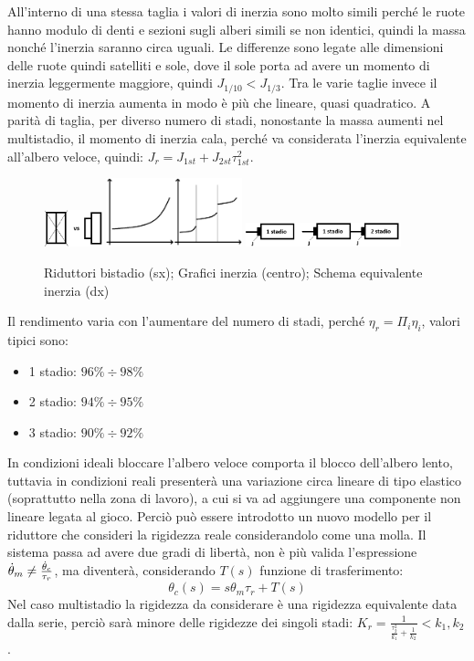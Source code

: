 All'interno di una stessa taglia i valori di inerzia sono molto simili perché le ruote hanno modulo di denti e sezioni sugli alberi simili se non identici, quindi la massa nonché l'inerzia saranno circa uguali.
Le differenze sono legate alle dimensioni delle ruote quindi satelliti e sole, dove il sole porta ad avere un momento di inerzia leggermente maggiore, quindi $J_{1/10}<J_{1/3}$.
Tra le varie taglie invece il momento di inerzia aumenta in modo è più che lineare, quasi quadratico.
A parità di taglia, per diverso numero di stadi, nonostante la massa aumenti nel multistadio, il momento di inerzia cala, perché va considerata l'inerzia equivalente all'albero veloce, quindi: $J_r=J_{1st}+J_{2st}\tau_{1st}^2$.

\begin{figure}[h]
    \centering
    \includegraphics[width=0.15\textwidth]{Immagini/ridutt_2st_diff_dim.png}
    \includegraphics[width=0.35\textwidth]{Immagini/momento_inerzia_stadi.png}
    \includegraphics[width=0.4\textwidth]{Immagini/momento_inerzia_albero_veloce.png}
    \caption{Riduttori bistadio (sx); Grafici inerzia (centro); Schema equivalente inerzia (dx)}
\end{figure}

Il rendimento varia con l'aumentare del numero di stadi, perché $\eta_r=\Pi_i \eta_i$, valori tipici sono:
\begin{itemize}
    \item 1 stadio: $96\% \div 98\%$
    \item 2 stadio: $94\% \div 95\%$
    \item 3 stadio: $90\% \div 92\%$
\end{itemize}

In condizioni ideali bloccare l'albero veloce comporta il blocco dell'albero lento, tuttavia in condizioni reali presenterà una variazione circa lineare di tipo elastico (soprattutto nella zona di lavoro), a cui si va ad aggiungere una componente non lineare legata al gioco.
Perciò può essere introdotto un nuovo modello per il riduttore che consideri la rigidezza reale considerandolo come una molla.
Il sistema passa ad avere due gradi di libertà, non è più valida l'espressione $\dot{\theta}_m \neq \frac{\dot{\theta}_c}{\tau_r}$, ma diventerà, considerando $T(s)$ funzione di trasferimento:
\[\theta_c(s)=s \theta_m \tau_r + T(s)\]
Nel caso multistadio la rigidezza da considerare è una rigidezza equivalente data dalla serie, perciò sarà minore delle rigidezze dei singoli stadi: $K_r=\frac{1}{\frac{\tau_2^2}{k_1}+\frac{1}{k_2}}<k_1,k_2$.

